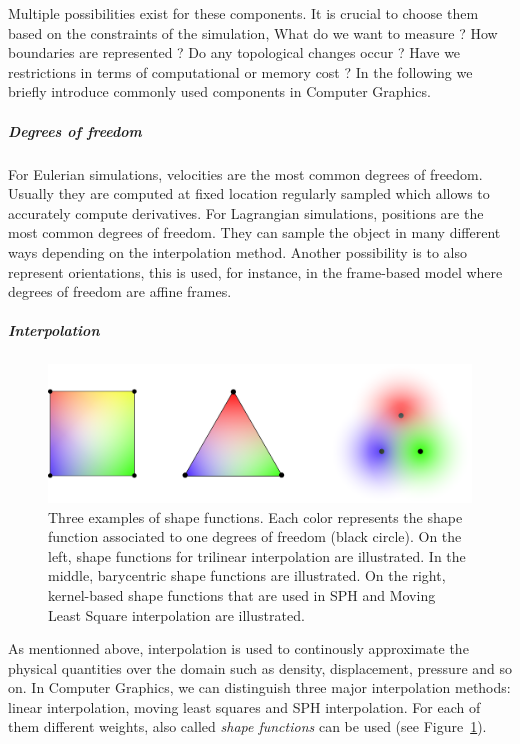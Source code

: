 Multiple possibilities exist for these components. It is crucial to choose them based on the constraints of the simulation, What do we want to measure ? How boundaries are represented ? Do any topological changes occur ? Have we restrictions in terms of computational or memory cost ? In the following we briefly introduce commonly used components in Computer Graphics.

\subparagraph{Degrees of freedom}
For Eulerian simulations, velocities are the most common degrees of freedom. Usually they are computed at fixed location regularly sampled which allows to accurately compute derivatives. For Lagrangian simulations, positions are the most common degrees of freedom. They can sample the object in many different ways depending on the interpolation method. Another possibility is to also represent orientations, this is used, for instance, in the frame-based model where degrees of freedom are affine frames.

\subparagraph{Interpolation}

\begin{figure}[!ht]
\centering
\includegraphics[scale=0.5]{images/continuum_mechanics/shapefunction.png}
\caption[STAR mechanics: Shape functions]{\label{fig:shapefunction} Three examples of shape functions. Each color represents the shape function associated to one degrees of freedom (black circle). On the left, shape functions for trilinear interpolation are illustrated. In the middle, barycentric shape functions are illustrated. On the right, kernel-based shape functions that are used in SPH and Moving Least Square interpolation are illustrated.}
\end{figure}

As mentionned above, interpolation is used to continously approximate the physical quantities over the domain such as density, displacement, pressure and so on. In Computer Graphics, we can distinguish three major interpolation methods: linear interpolation, moving least squares and SPH interpolation. For each of them different weights, also called \emph{shape functions} can be used (see Figure~\ref{fig:shapefunction}). 

